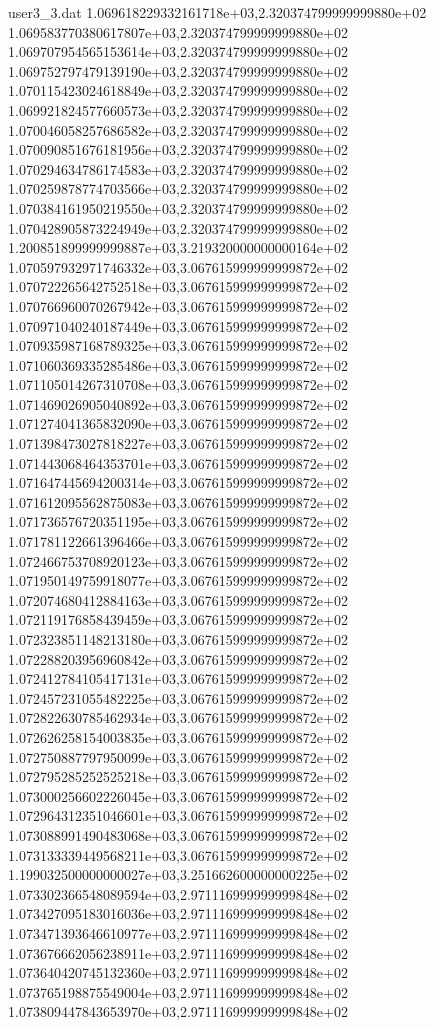\begin{filecontents}{user3_3.dat}
1.069618229332161718e+03,2.320374799999999880e+02
1.069583770380617807e+03,2.320374799999999880e+02
1.069707954565153614e+03,2.320374799999999880e+02
1.069752797479139190e+03,2.320374799999999880e+02
1.070115423024618849e+03,2.320374799999999880e+02
1.069921824577660573e+03,2.320374799999999880e+02
1.070046058257686582e+03,2.320374799999999880e+02
1.070090851676181956e+03,2.320374799999999880e+02
1.070294634786174583e+03,2.320374799999999880e+02
1.070259878774703566e+03,2.320374799999999880e+02
1.070384161950219550e+03,2.320374799999999880e+02
1.070428905873224949e+03,2.320374799999999880e+02
1.200851899999999887e+03,3.219320000000000164e+02
1.070597932971746332e+03,3.067615999999999872e+02
1.070722265642752518e+03,3.067615999999999872e+02
1.070766960070267942e+03,3.067615999999999872e+02
1.070971040240187449e+03,3.067615999999999872e+02
1.070935987168789325e+03,3.067615999999999872e+02
1.071060369335285486e+03,3.067615999999999872e+02
1.071105014267310708e+03,3.067615999999999872e+02
1.071469026905040892e+03,3.067615999999999872e+02
1.071274041365832090e+03,3.067615999999999872e+02
1.071398473027818227e+03,3.067615999999999872e+02
1.071443068464353701e+03,3.067615999999999872e+02
1.071647445694200314e+03,3.067615999999999872e+02
1.071612095562875083e+03,3.067615999999999872e+02
1.071736576720351195e+03,3.067615999999999872e+02
1.071781122661396466e+03,3.067615999999999872e+02
1.072466753708920123e+03,3.067615999999999872e+02
1.071950149759918077e+03,3.067615999999999872e+02
1.072074680412884163e+03,3.067615999999999872e+02
1.072119176858439459e+03,3.067615999999999872e+02
1.072323851148213180e+03,3.067615999999999872e+02
1.072288203956960842e+03,3.067615999999999872e+02
1.072412784105417131e+03,3.067615999999999872e+02
1.072457231055482225e+03,3.067615999999999872e+02
1.072822630785462934e+03,3.067615999999999872e+02
1.072626258154003835e+03,3.067615999999999872e+02
1.072750887797950099e+03,3.067615999999999872e+02
1.072795285252525218e+03,3.067615999999999872e+02
1.073000256602226045e+03,3.067615999999999872e+02
1.072964312351046601e+03,3.067615999999999872e+02
1.073088991490483068e+03,3.067615999999999872e+02
1.073133339449568211e+03,3.067615999999999872e+02
1.199032500000000027e+03,3.251662600000000225e+02
1.073302366548089594e+03,2.971116999999999848e+02
1.073427095183016036e+03,2.971116999999999848e+02
1.073471393646610977e+03,2.971116999999999848e+02
1.073676662056238911e+03,2.971116999999999848e+02
1.073640420745132360e+03,2.971116999999999848e+02
1.073765198875549004e+03,2.971116999999999848e+02
1.073809447843653970e+03,2.971116999999999848e+02

\end{filecontents}
